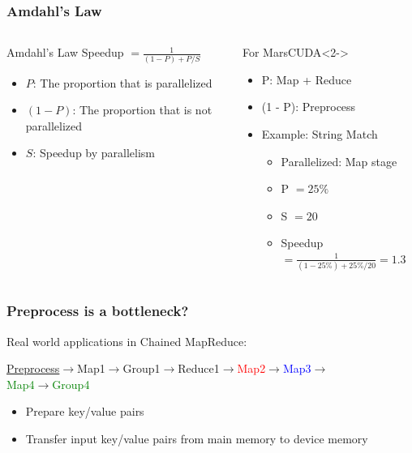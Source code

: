 \begin{frame}
\frametitle{Amdahl's Law}
\begin{columns}
\begin{block}{Amdahl's Law}
Speedup $= \frac{1}{(1 - P) + P/S}$
\begin{itemize}
\item $P$: The proportion that is parallelized
\item $(1 - P)$: The proportion that is not parallelized
\item $S$: Speedup by parallelism
\end{itemize}
\end{block}
\begin{block}{For MarsCUDA}<2->
\begin{itemize}
\item P: Map + Reduce
\item (1 - P): Preprocess
\item Example: String Match
\begin{itemize}
\item Parallelized: Map stage
\item P $= 25\%$
\item S $= 20$
\item Speedup $= \frac{1}{(1 - 25\%)+25\%/20} = 1.3$
\end{itemize}
\end{itemize}
\end{block}
\end{columns}
\end{frame}

\begin{frame}
\frametitle{Preprocess is a bottleneck?}
Real world applications in Chained MapReduce:

\underline{Preprocess}$\rightarrow$Map1$\rightarrow$Group1$\rightarrow$Reduce1$\rightarrow$\textcolor{red}{Map2}$\rightarrow$\textcolor{blue}{Map3}$\rightarrow$\\
\textcolor{green}{Map4}$\rightarrow$\textcolor{green}{Group4}
\begin{itemize}
\item Prepare key/value pairs
\item Transfer input key/value pairs from main memory to device memory
\end{itemize}
\end{frame}


